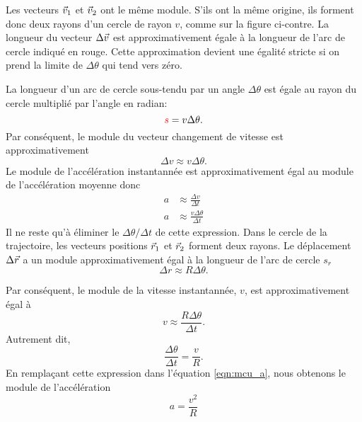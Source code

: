 \documentclass{tufte-handout}
\begin{document}
Les vecteurs $\vec{v}_1$ et $\vec{v}_2$ ont le même module.  S'ils ont la même origine,
ils forment donc deux rayons d'un cercle de rayon $v$, comme sur la figure
ci-contre.  La longueur du vecteur $\Delta \vec{v}$ est approximativement égale à
la longueur de l'arc de cercle indiqué en rouge.  Cette approximation devient
une égalité stricte si on prend la limite de $\Delta \theta$ qui tend vers
zéro.
\begin{marginfigure}
\end{marginfigure}
La longueur d'un arc de cercle sous-tendu par un angle $\Delta \theta$ est
égale au rayon du cercle multiplié par l'angle en radian:
\[
  {\color{red}s} = v\Delta \theta.
\]
Par conséquent, le module du vecteur changement de vitesse est
approximativement
\[
  \Delta v \approx v\Delta\theta.
\]
Le module de l'accélération instantannée est approximativement égal au module
de l'accélération moyenne donc
\begin{align}
  a &\approx \frac{\Delta v}{\Delta t} \nonumber\\
  a &\approx \frac{v \Delta\theta}{\Delta t} \label{eqn:mcu_a} 
\end{align}
Il ne reste qu'à éliminer le $\Delta \theta / \Delta t$ de cette expression.
Dans le cercle de la trajectoire, les vecteurs positions $\vec{r}_1$ et $\vec{r}_2$
forment deux rayons.  Le déplacement $\Delta \vec{r}$ a un module approximativement
égal à la longueur de l'arc de cercle $s_r$
\[
  \Delta r \approx R \Delta \theta.
\]
\begin{marginfigure}
\end{marginfigure}
Par conséquent, le module de la vitesse instantannée, $v$, est
approximativement égal à
\[
  v \approx \frac{R\Delta \theta}{\Delta t}.
\]
Autrement dit,
\[
  \frac{\Delta \theta}{\Delta t} = \frac{v}{R}.
\]
En remplaçant cette expression dans l'équation \ref{eqn:mcu_a}, nous obtenons
le module de l'accélération
\[
  a = \frac{v^2}{R} 
\]
\end{document}
